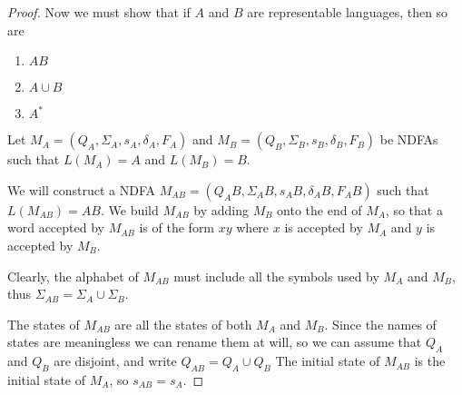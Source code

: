 \documentclass{bcthesis}
\begin{document}
\begin{proof}
		Now we must show that if $A$ and $B$ are representable languages, then so are
		\begin{enumerate}[label=(\roman*), itemsep = -0.3 ex, nolistsep]
			\item $AB$
			\item $A \cup B$
			\item $A^*$
		\end{enumerate}

			\newcommand{\ma}{\ensuremath{M_A}\xspace}
				\newcommand{\qa}{\ensuremath{Q_A}\xspace}
				\newcommand{\siga}{\ensuremath{\Sigma_A}\xspace}
				\newcommand{\sa}{\ensuremath{s_A}\xspace}
				\newcommand{\dala}{\ensuremath{\delta_A}\xspace} %
				\newcommand{\fa}{\ensuremath{F_A}\xspace}

			\newcommand{\mb}{\ensuremath{M_B}\xspace}
				\newcommand{\qb}{\ensuremath{Q_B}\xspace}
				\newcommand{\sigb}{\ensuremath{\Sigma_B}\xspace}
				\renewcommand{\sb}{\ensuremath{s_B}\xspace}
				\newcommand{\dalb}{\ensuremath{\delta_B}\xspace}
				\newcommand{\fb}{\ensuremath{F_B}\xspace}

			\newcommand{\mab}{\ensuremath{M_{AB}}\xspace}
				\newcommand{\qab}{\ensuremath{Q_{AB}}\xspace}
				\newcommand{\sigab}{\ensuremath{\Sigma_{AB}}\xspace}
				\newcommand{\sab}{\ensuremath{s_{AB}}\xspace}
				\newcommand{\dalab}{\ensuremath{\delta_{AB}}\xspace}
				\newcommand{\fab}{\ensuremath{F_{AB}}\xspace}

			\newcommand{\maub}{\ensuremath{M_{A \cup B}}\xspace}
			\newcommand{\mas}{\ensuremath{M_{A^*}}\xspace}


		Let $M_A = (Q_A, \Sigma_A, s_A, \delta_A, F_A)$ and $M_B = (Q_B, \Sigma_B, s_B, \delta_B, F_B)$ be NDFAs such that $L(\ma) = A$ and $L(\mb) = B$.

		We will construct a NDFA $M_{AB} = (Q_AB, \Sigma_AB, s_AB, \delta_AB, F_AB)$ such that $L(\mab) = AB$.
		We build \mab by adding \mb onto the end of \ma, so that a word accepted by \mab is of the form $xy$ where $x$ is accepted by \ma and $y$ is accepted by \mb.

		Clearly, the alphabet of \mab must include all the symbols used by \ma and \mb, thus $\sigab = \siga \cup \sigb$.
		
		The states of \mab are all the states of both \ma and \mb.
		Since the names of states are meaningless we can rename them at will, so we can assume that \qa and \qb are disjoint, and write $\qab = \qa \cup \qb$
		The initial state of \mab is the initial state of \ma, so $\sab = \sa$.


\end{proof}
\end{document}
